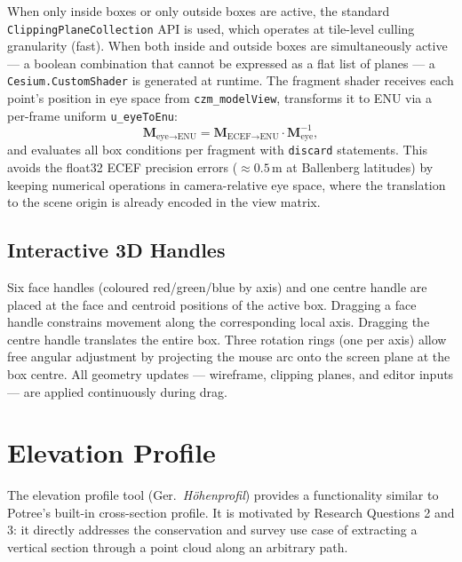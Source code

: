 When only inside boxes or only outside boxes are active, the standard
\texttt{ClippingPlaneCollection} API is used, which operates at tile-level
culling granularity (fast). When both inside and outside boxes are
simultaneously active — a boolean combination that cannot be expressed as a
flat list of planes — a \texttt{Cesium.CustomShader} is generated at runtime.
The fragment shader receives each point's position in eye space from
\texttt{czm\_modelView}, transforms it to ENU via a per-frame uniform
\texttt{u\_eyeToEnu}:
\begin{equation}
  \mathbf{M}_{\text{eye}\to\text{ENU}} = \mathbf{M}_{\text{ECEF}\to\text{ENU}}
    \cdot \mathbf{M}_{\text{eye}}^{-1},
\end{equation}
and evaluates all box conditions per fragment with \texttt{discard}
statements. This avoids the float32 ECEF precision errors ($\approx 0.5$\,m at
Ballenberg latitudes) by keeping numerical operations in camera-relative eye
space, where the translation to the scene origin is already encoded in the
view matrix.

\subsection{Interactive 3D Handles}

Six face handles (coloured red/green/blue by axis) and one centre handle are
placed at the face and centroid positions of the active box. Dragging a face
handle constrains movement along the corresponding local axis. Dragging the
centre handle translates the entire box. Three rotation rings (one per axis)
allow free angular adjustment by projecting the mouse arc onto the screen
plane at the box centre. All geometry updates — wireframe, clipping planes,
and editor inputs — are applied continuously during drag.

\section{Elevation Profile}
\label{sec:profile}

The elevation profile tool (Ger.\ \textit{Höhenprofil}) provides a
functionality similar to Potree's built-in cross-section profile. It is
motivated by Research Questions 2 and 3: it directly addresses the
conservation and survey use case of extracting a vertical section through a
point cloud along an arbitrary path.

